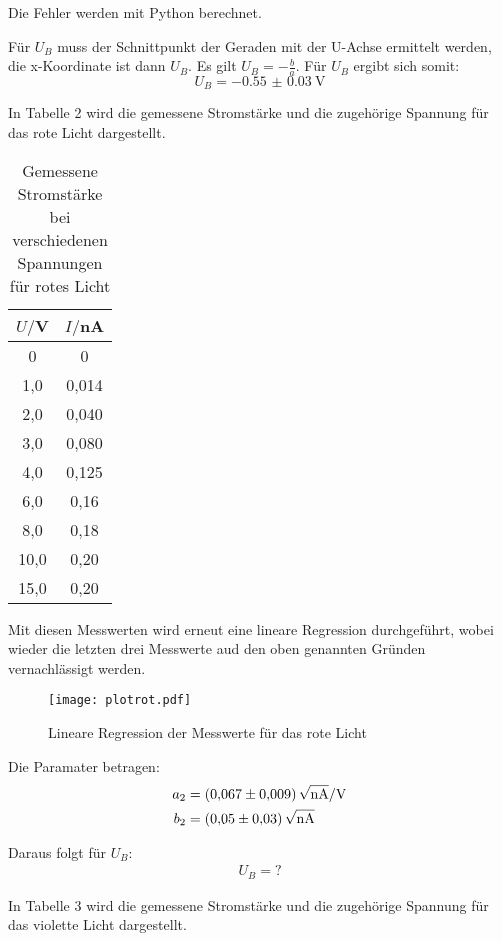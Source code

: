 Die Fehler werden mit Python berechnet.

Für $U_B$ muss der Schnittpunkt der Geraden mit der U-Achse ermittelt werden, die x-Koordinate ist dann $U_B$.
Es gilt $U_B = -\frac{b}{a}$. Für $U_B$ ergibt sich somit:
\begin{equation*}
  U_B = \SI{-0.55(3)}{\volt}
\end{equation*}


In Tabelle 2 wird die gemessene Stromstärke und die zugehörige Spannung für das rote Licht dargestellt.

\begin{table}[H]
  \centering
  \caption{Gemessene Stromstärke bei verschiedenen Spannungen für rotes Licht}
  \label{tab:Spannungsamplitude}
  \begin{tabular}{c c}
    \toprule
    $U/$V & $I/$nA \\
    \midrule
     0 & 0 \\
     1,0 & 0,014 \\
     2,0 & 0,040 \\
     3,0 & 0,080 \\
     4,0 & 0,125 \\
     6,0 & 0,16 \\
     8,0 & 0,18 \\
    10,0 & 0,20 \\
    15,0 & 0,20 \\
    \bottomrule
  \end{tabular}
\end{table}

Mit diesen Messwerten wird erneut eine lineare Regression durchgeführt, wobei wieder die letzten drei Messwerte
aud den oben genannten Gründen vernachlässigt werden.

\begin{figure}[H]
  \centering
  \texttt{[image: plotrot.pdf]}
  \caption{Lineare Regression der Messwerte für das rote Licht}
  \label{fig:plot}
\end{figure}

Die Paramater betragen:
\begin{align*}
  a_2 &= \SI{0.067(9)}{\sqrt{\nano\ampere}\per\volt} \\
  b_2 &= \SI{0.05(3)}{\sqrt{\nano\ampere}}
\end{align*}

Daraus folgt für $U_B$:
\begin{align*}
  U_B = ?
\end{align*}


In Tabelle 3 wird die gemessene Stromstärke und die zugehörige Spannung für das violette Licht dargestellt.

